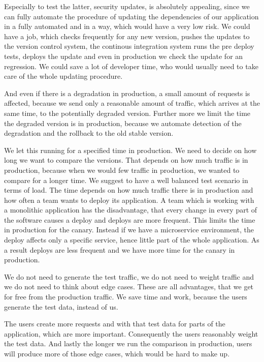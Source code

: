 Especially to test the latter, security updates, is absolutely appealing, since we can
fully automate the procedure of updating the dependencies of our application in a fully
automated and in a way, which would have a very low risk. We could have a job, which
checks frequently for any new version, pushes the updates to the version control system,
the continous integration system runs the pre deploy tests, \deployer deploys the update
and even in production we check the update for an regression. We could save a lot of
developer time, who would usually need to take care of the whole updating procedure.

And even if there is a degradation in production, a small amount of requests is affected,
because we send only a reasonable amount of traffic, which arrives at the same time, to
the potentially degraded version. Further more we limit the time the degraded version is
in production, because we automate detection of the degradation and the rollback to the
old stable version.


We let this running for a specified time in production. We need to decide on how long we
want to compare the versions. That depends on how much traffic is in production, because
when we would few traffic in production, we wanted to compare for a longer time. We
suggest to have a well balanced test scenario in terms of load. The time depends on how
much traffic there is in production and how often a team wants to deploy its
application. A team which is working with a monolithic application has the disadvantage,
that every change in every part of the software causes a deploy and deploys are more
frequent. This limits the time in production for the canary. Instead if we have a
microservice environment, the deploy affects only a specific service, hence little part of
the whole application. As a result deploys are less frequent and we have more time for the
canary in production.

We do not need to generate the test traffic, we do not need to weight traffic and we do
not need to think about edge cases. These are all advantages, that we get for free from
the production traffic. We save time and work, because the users generate the test data,
instead of us.

The users create more requests and with that test data for parts of the application, which
are more important. Consequently the users reasonably weight the test data. And lastly the
longer we run the comparison in production, users will produce more of those edge cases,
which would be hard to make up.


